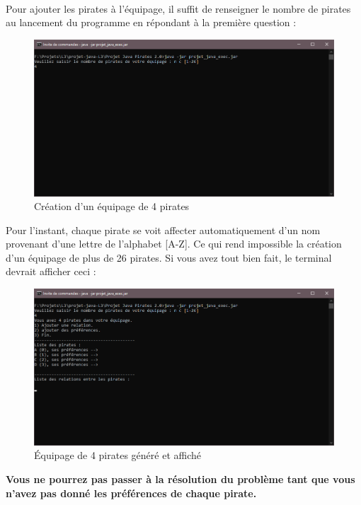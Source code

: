 \documentclass[12pt]{article}
\begin{document}
\paragraph{} Pour ajouter les pirates à l'équipage, il suffit de renseigner le nombre de pirates au lancement du programme en répondant à la première question :
\begin{figure}[H]
\includegraphics[width=16cm]{ajout_pirate}
\centering
\caption{Création d'un équipage de 4 pirates}
\end{figure}
Pour l'instant, chaque pirate se voit affecter automatiquement d'un nom provenant d'une lettre de l'alphabet [A-Z]. Ce qui rend impossible la création d'un équipage de plus de 26 pirates. Si vous avez tout bien fait, le terminal devrait afficher ceci :
\begin{figure}[H]
\includegraphics[width=16cm]{main_menu}
\centering
\caption{Équipage de 4 pirates généré et affiché}
\end{figure}
\textbf{Vous ne pourrez pas passer à la résolution du problème tant que vous n'avez pas donné les préférences de chaque pirate.}
\end{document}
